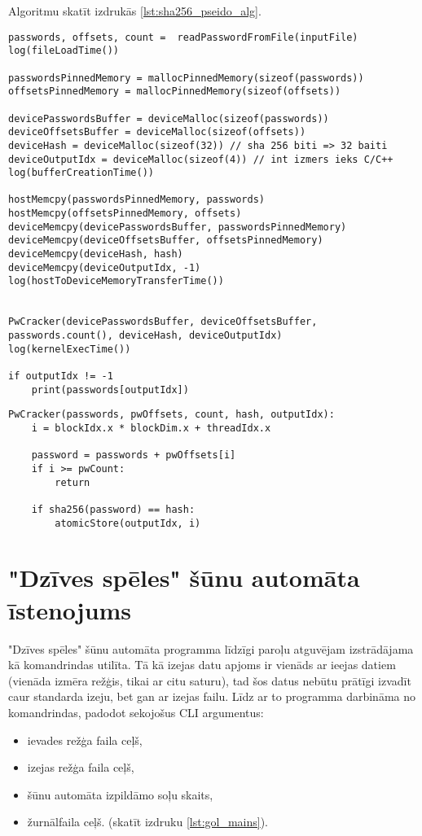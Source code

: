 Algoritmu skatīt izdrukās \ref{lst:sha256_pseido_alg}.
\begin{lstlisting}[caption={Paroļu atguvēja CPU puses pseidokods},
captionpos=b,
    label=lst:sha256_pseido_alg]
passwords, offsets, count =  readPasswordFromFile(inputFile)
log(fileLoadTime())

passwordsPinnedMemory = mallocPinnedMemory(sizeof(passwords))
offsetsPinnedMemory = mallocPinnedMemory(sizeof(offsets))

devicePasswordsBuffer = deviceMalloc(sizeof(passwords))
deviceOffsetsBuffer = deviceMalloc(sizeof(offsets))
deviceHash = deviceMalloc(sizeof(32)) // sha 256 biti => 32 baiti
deviceOutputIdx = deviceMalloc(sizeof(4)) // int izmers ieks C/C++
log(bufferCreationTime())

hostMemcpy(passwordsPinnedMemory, passwords)
hostMemcpy(offsetsPinnedMemory, offsets)
deviceMemcpy(devicePasswordsBuffer, passwordsPinnedMemory)
deviceMemcpy(deviceOffsetsBuffer, offsetsPinnedMemory)
deviceMemcpy(deviceHash, hash)
deviceMemcpy(deviceOutputIdx, -1)
log(hostToDeviceMemoryTransferTime())


PwCracker(devicePasswordsBuffer, deviceOffsetsBuffer, passwords.count(), deviceHash, deviceOutputIdx)
log(kernelExecTime())

if outputIdx != -1
    print(passwords[outputIdx])
\end{lstlisting}


\begin{lstlisting}[caption={Paroļu atguvēja GPGPU kodola pseidokods},
    captionpos=b,
    label=lst:sha256_pseido_alg_device]
PwCracker(passwords, pwOffsets, count, hash, outputIdx):
    i = blockIdx.x * blockDim.x + threadIdx.x

    password = passwords + pwOffsets[i]
    if i >= pwCount:
        return

    if sha256(password) == hash:
        atomicStore(outputIdx, i)
\end{lstlisting}

\section{"Dzīves spēles" šūnu automāta īstenojums} \label{gol_section}
"Dzīves spēles" šūnu automāta programma līdzīgi paroļu atguvējam izstrādājama kā
komandrindas utilīta. Tā kā izejas datu apjoms ir vienāds ar ieejas datiem
(vienāda izmēra režģis, tikai ar citu saturu), tad šos datus nebūtu prātīgi
izvadīt caur standarda izeju, bet gan ar izejas failu. Līdz ar to
programma darbināma no komandrindas, padodot sekojošus CLI argumentus:
\begin{itemize}
    \item ievades režģa faila ceļš,
    \item izejas režģa faila ceļš,
    \item šūnu automāta izpildāmo soļu skaits,
    \item žurnālfaila ceļš. (skatīt izdruku \ref{lst:gol_mains}).
\end{itemize}

